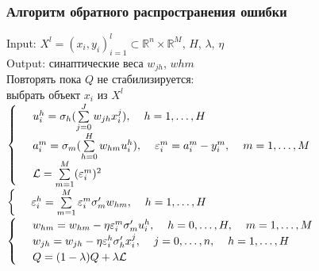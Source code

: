 \documentclass[12pt]{beamer}
\begin{document}
\begin{frame}\frametitle{Алгоритм обратного распространения ошибки}
Input: $X^l = (x_i, y_i)_{i=1}^l \subset \mathbb{R}^n \times \mathbb{R}^M$, $H$, $\lambda$, $\eta$\\
Output: синаптические веса $w_{jh}$, $w{hm}$\\
Повторять пока $Q$ не стабилизируется:\\
\hspace{5mm} выбрать объект $x_i$ из $X^l$\\
$\begin{cases}
\hspace{5mm} u^h_i = \sigma_h (\sum\limits_{j=0}^J w_{jh} x_i^j), \hspace{4mm} h = 1, \dots, H\\
\hspace{5mm} a^m_i = \sigma_m (\sum\limits_{h=0}^H w_{hm} u_i^h), \hspace{4mm} \varepsilon_i^m = a_i^m - y_i^m, \hspace{4mm} m = 1, \dots, M\\
\hspace{5mm} \mathcal{L} = \sum\limits_{m=1}^M (\varepsilon_i^m)^2\\
\end{cases}$\\
$\begin{cases} \hspace{5mm} \varepsilon_i^h = \sum\limits_{m=1}^M \varepsilon_i^m \sigma'_m w_{hm}, \hspace{4mm} h = 1, \dots, H\end{cases}$\\
$\begin{cases} \hspace{5mm} w_{hm} = w_{hm} - \eta \varepsilon_i^m \sigma'_m u_i^h, \hspace{4mm} h = 0, \dots, H, \hspace{4mm} m = 1, \dots, M\\
\hspace{5mm} w_{jh} = w_{jh} - \eta \varepsilon_i^h \sigma'_h x_i^j, \hspace{4mm} j = 0, \dots, n, \hspace{4mm} h = 1, \dots, H\\
\hspace{5mm} Q = (1 - \lambda)Q + \lambda \mathcal{L}\end{cases}$\\
\end{frame}
\end{document}
